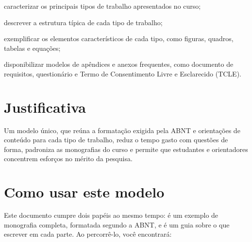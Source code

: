 \begin{alineas}
	\item caracterizar os principais tipos de trabalho apresentados no curso;
	\item descrever a estrutura típica de cada tipo de trabalho;
	\item exemplificar os elementos característicos de cada tipo, como figuras, quadros, tabelas e equações;
	\item disponibilizar modelos de apêndices e anexos frequentes, como documento de requisitos, questionário e Termo de Consentimento Livre e Esclarecido (TCLE).
\end{alineas}

\section{Justificativa}

Um modelo único, que reúna a formatação exigida pela ABNT e orientações de conteúdo para cada tipo de trabalho, reduz o tempo gasto com questões de forma, padroniza as monografias do curso e permite que estudantes e orientadores concentrem esforços no mérito da pesquisa.

\section{Como usar este modelo}
\label{sec_como_usar}

Este documento cumpre dois papéis ao mesmo tempo: é um exemplo de monografia completa, formatada segundo a ABNT, e é um guia sobre o que escrever em cada parte. Ao percorrê-lo, você encontrará:

